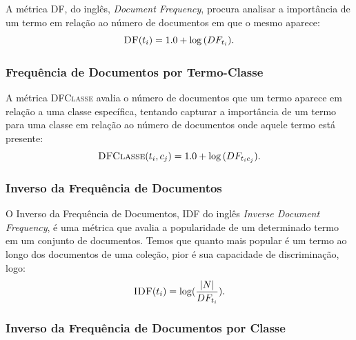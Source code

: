 A métrica \textsc{DF}, do inglês, \textit{Document Frequency}, procura analisar a importância de um termo em relação ao número de documentos em que o mesmo aparece:
\begin{equation}\label{eqn::df}
  \textsc{DF}(t_i) = 1.0 + \log{ ( DF_{t_i} ) }.
\end{equation}



\subsubsection{Frequência de Documentos por Termo-Classe}%
\label{subsubsection::sumdf}

A métrica \textsc{DFClasse} avalia o número de documentos que um termo aparece em relação a uma classe específica, tentando capturar a importância de um termo para uma classe em relação ao número de documentos onde aquele termo está presente:
\begin{equation}\label{eqn::sumtf}
 \textsc{DFClasse}(t_i,c_j) = 1.0 + \log{ ( DF_{t_ic_j} ) }.
\end{equation}


\subsubsection{Inverso da Frequência de Documentos}%
\label{subsubsection::idf}

O Inverso da Frequência de Documentos, \textsc{IDF} do inglês \textit{Inverse Document Frequency}, é uma métrica que avalia a popularidade de um determinado termo em um conjunto de documentos. Temos que quanto mais popular é um termo ao longo dos documentos de uma coleção, pior é sua capacidade de discriminação, logo:
\begin{equation}\label{eqn::tficf}
 \textsc{IDF}(t_i) = \log( \frac{|N|} {DF_{t_i}} ).
\end{equation}


\subsubsection{Inverso da Frequência de Documentos por Classe}%
\label{subsubsection::idf}

